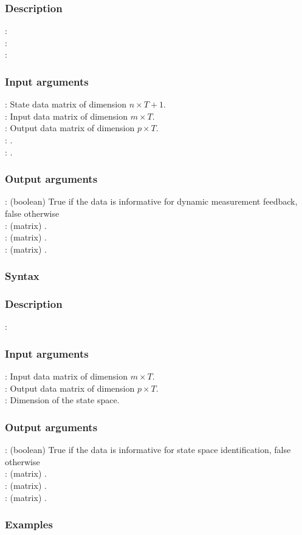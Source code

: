 \subsubsection*{Description} 
: \\
: \\
: 

\subsubsection*{Input arguments} 
\textbf{}: State data matrix of dimension $n \times T+1$.\\
\textbf{}: Input data matrix of dimension $m \times T$.\\
\textbf{}: Output data matrix of dimension $p \times T$.\\
\textbf{}: .\\
\textbf{}: .

\subsubsection*{Output arguments} 
\textbf{}: (boolean) True if the data is informative for dynamic measurement feedback, false otherwise\\
\textbf{}: (matrix) .\\
\textbf{}: (matrix) .\\
\textbf{}: (matrix) .


\subsubsection*{Syntax}

\subsubsection*{Description}
: 

\subsubsection*{Input arguments}
\textbf{}: Input data matrix of dimension $m \times T$.\\
\textbf{}: Output data matrix of dimension $p \times T$.\\
\textbf{}: Dimension of the state space.

\subsubsection*{Output arguments}
\textbf{}: (boolean) True if the data is informative for state space identification, false otherwise\\
\textbf{}: (matrix) .\\
\textbf{}: (matrix) .\\
\textbf{}: (matrix) .

\subsubsection{Examples}